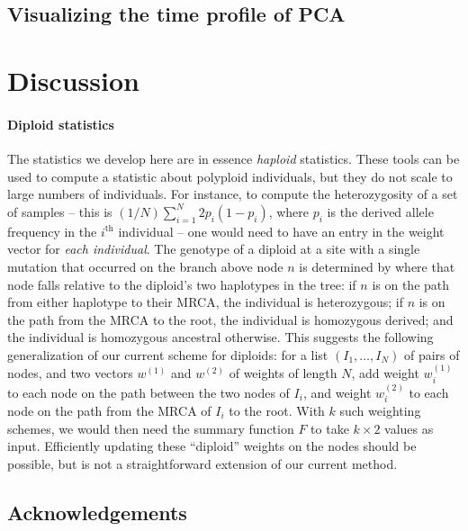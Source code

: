 \documentclass{article}
\begin{document}
\subsection*{Visualizing the time profile of PCA}



\section*{Discussion}


\paragraph{Diploid statistics}
The statistics we develop here are in essence \emph{haploid} statistics.
These tools can be used to compute a statistic about polyploid individuals,
but they do not scale to large numbers of individuals.
For instance, to compute the heterozygosity of a set of samples
-- this is $(1/N) \sum_{i=1}^N 2 p_i (1-p_i)$, where $p_i$ is the derived allele frequency
in the $i^\text{th}$ individual --
one would need to have an entry in the weight vector for \emph{each individual}.
The genotype of a diploid at a site with a single mutation that occurred on the branch above node $n$
is determined by where that node falls relative to the diploid's two haplotypes in the tree:
if $n$ is on the path from either haplotype to their MRCA, the individual is heterozygous;
if $n$ is on the path from the MRCA to the root, the individual is homozygous derived;
and the individual is homozygous ancestral otherwise.
This suggests the following generalization of our current scheme for diploids:
for a list $(I_1, \ldots, I_N)$ of pairs of nodes,
and two vectors $w^{(1)}$ and $w^{(2)}$ of weights of length $N$,
add weight $w^{(1)}_i$ to each node on the path between the two nodes of $I_i$,
and weight $w^{(2)}_i$ to each node on the path from the MRCA of $I_i$ to the root.
With $k$ such weighting schemes, we would then need the summary function $F$ 
to take $k \times 2$ values as input.
Efficiently updating these ``diploid'' weights on the nodes should be possible,
but is not a straightforward extension of our current method.




\subsection*{Acknowledgements}
\end{document}
